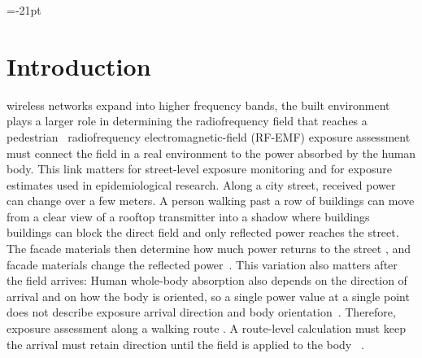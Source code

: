 \documentclass{IEEEoj} %
\providecommand{\DIFadd}[1]{{\protect\color{blue} \sf #1}} %
\providecommand{\DIFdel}[1]{{\protect\color{red} \scriptsize #1}} %
\providecommand{\DIFaddbegin}{} %
\providecommand{\DIFaddend}{} %
\providecommand{\DIFdelbegin}{} %
\providecommand{\DIFdelend}{} %
\begin{document}
\DIFdelbegin %
\DIFdel{=-21pt
}\DIFdelend \maketitle

\section{Introduction}\label{sec:introduction}

\DIFdelbegin %
\DIFdel{wireless networks expand into higher frequency bands,
the built environment plays a larger role in determining the radiofrequency field that reaches a pedestrian~\cite{itu2040}}\DIFdelend \DIFaddbegin {} \DIFadd{radiofrequency electromagnetic-field (RF-EMF)
exposure assessment must connect the field in a real environment to the power
absorbed by the human body. This link matters for street-level exposure
monitoring and for exposure estimates used in epidemiological research}\DIFaddend . Along
a city street, \DIFdelbegin \DIFdel{received
power can change over a few meters. A person walking past a row of buildings can move from a clear view of a rooftop transmitter into a shadow where
buildings }\DIFdelend \DIFaddbegin \DIFadd{buildings can }\DIFaddend block the direct field\DIFdelbegin \DIFdel{and only reflected power reaches the
street. The facade materials
then determine how much power returns to the street}\DIFdelend \DIFaddbegin \DIFadd{, and facade materials
change the reflected power}\DIFaddend ~\cite{itu2040,vitucci}. \DIFdelbegin \DIFdel{This variation also matters after the field
arrives: }\DIFdelend \DIFaddbegin \DIFadd{Human }\DIFaddend whole-body absorption
\DIFaddbegin \DIFadd{also }\DIFaddend depends on the \DIFdelbegin \DIFdel{direction of arrival and on how
the body is oriented, so a single power value at a single point does not
describe exposure }\DIFdelend \DIFaddbegin \DIFadd{arrival direction and body orientation~\cite{icnirp}.
Therefore, exposure assessment }\DIFaddend along a walking route \DIFdelbegin \DIFdel{. A route-level calculation must keep
the arrival }\DIFdelend \DIFaddbegin \DIFadd{must retain }\DIFaddend direction
until the field is applied to the body\DIFdelbegin \DIFdel{~\cite{icnirp}}\DIFdelend .
\end{document}
